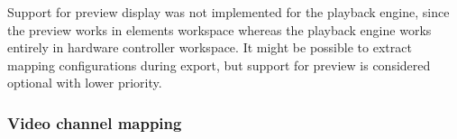\documentclass[journal]{IEEEtran}
\begin{document}
Support for preview display was not implemented for the playback engine, since the preview works in elements workspace whereas the playback engine works entirely in hardware controller workspace. It might be possible to extract mapping configurations during export, but support for preview is considered optional with lower priority.

\subsubsection{Video channel mapping}
\hfill
{}




\end{document}

